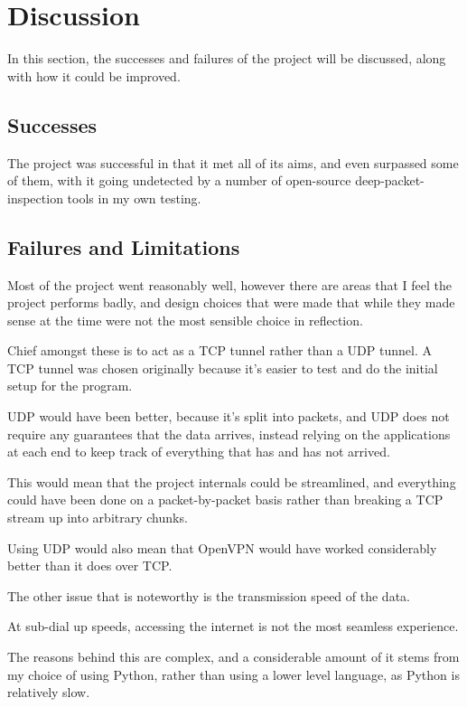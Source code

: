 \section{Discussion}
In this section, the successes and failures of the project will be discussed, along with how it could be improved.
\subsection{Successes}
The project was successful in that it met all of its aims, and even surpassed some of them, with it going undetected by a number of open-source deep-packet-inspection tools in my own testing.

\subsection{Failures and Limitations}
Most of the project went reasonably well, however there are areas that I feel the project performs badly, and design choices that were made that while they made sense at the time were not the most sensible choice in reflection.\par
Chief amongst these is to act as a TCP tunnel rather than a UDP tunnel. A TCP tunnel was chosen originally because it's easier to test and do the initial setup for the program.\par
UDP would have been better, because it's split into packets, and UDP does not require any guarantees that the data arrives, instead relying on the applications at each end to keep track of everything that has and has not arrived.\par
This would mean that the project internals could be streamlined, and everything could have been done on a packet-by-packet basis rather than breaking a TCP stream up into arbitrary chunks.\par
Using UDP would also mean that OpenVPN would have worked considerably better than it does over TCP\@.\par
The other issue that is noteworthy is the transmission speed of the data.\par
At sub-dial up speeds, accessing the internet is not the most seamless experience.\par
The reasons behind this are complex, and a considerable amount of it stems from my choice of using Python, rather than using a lower level language, as Python is relatively slow.
